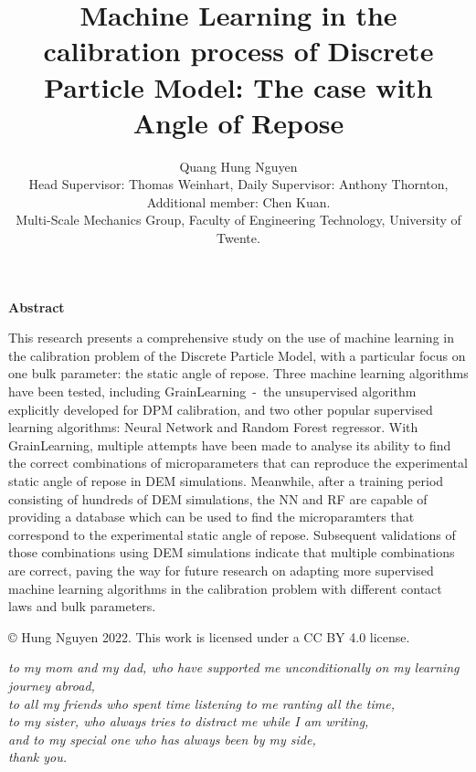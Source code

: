 \documentclass{article}
\title{Machine Learning in the calibration process of Discrete Particle Model: The case with Angle of Repose}
\author{Quang Hung Nguyen\\[1ex] \small Head Supervisor: Thomas Weinhart, Daily Supervisor: Anthony Thornton, Additional member: Chen Kuan. \\
\small Multi-Scale Mechanics Group, Faculty of Engineering Technology, University of Twente.}
\date{}
\begin{document}
\maketitle

\begin{center}
    \Large\textbf{Abstract}
\end{center}


\begin{center}
    This research presents a comprehensive study on the use of machine learning in the calibration problem of the Discrete Particle Model, with a particular focus on one bulk parameter: the static angle of repose. Three machine learning algorithms have been tested, including GrainLearning~-~the unsupervised algorithm explicitly developed for DPM calibration, and two other popular supervised learning algorithms: Neural Network and Random Forest regressor. With GrainLearning, multiple attempts have been made to analyse its ability to find the correct combinations of microparameters that can reproduce the experimental static angle of repose in DEM simulations. Meanwhile, after a training period consisting of hundreds of DEM simulations, the NN and RF are capable of providing a database which can be used to find the microparamters that correspond to the experimental static angle of repose. Subsequent validations of those combinations using DEM simulations indicate that multiple combinations are correct, paving the way for future research on adapting more supervised machine learning algorithms in the calibration problem with different contact laws and bulk parameters. 

    © Hung Nguyen 2022. This work is licensed under a CC BY 4.0 license. 
\end{center}



\pagebreak
{}
\vspace*{\fill}
\begin{flushright}
    \textit{to my mom and my dad, who have supported me unconditionally on my learning journey abroad, \\ to all my friends who spent time listening to me ranting all the time, \\ to my sister, who always tries to distract me while I am writing, \\ and to my special one who has always been by my side,}\\
    \textit{thank you.}
    \end{flushright}
    
\end{document}
